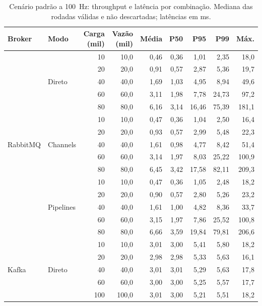 \begin{table}[p]
\centering
\caption{Cenário padrão a 100~Hz: throughput e latência por combinação. Mediana das
rodadas válidas e não descartadas; latências em ms.}
\label{tab:metricas-latencia}
\footnotesize
\begin{tabular}{|l|l|r|r|r|r|r|r|r|}
\hline
\textbf{Broker} & \textbf{Modo} & \textbf{Carga (mil)} & \textbf{Vazão (mil)} & \textbf{Média} & \textbf{P50} & \textbf{P95} & \textbf{P99} & \textbf{Máx.} \\
\hline
\multirow{15}{*}{RabbitMQ} & \multirow{5}{*}{Direto} & 10 & 10,0 & 0,46 & 0,36 & 1,01 & 2,35 & 18,0 \\
 &  & 20 & 20,0 & 0,91 & 0,57 & 2,87 & 5,36 & 19,7 \\
 &  & 40 & 40,0 & 1,69 & 1,03 & 4,95 & 8,94 & 49,6 \\
 &  & 60 & 60,0 & 3,11 & 1,98 & 7,78 & 24,73 & 97,2 \\
 &  & 80 & 80,0 & 6,16 & 3,14 & 16,46 & 75,39 & 181,1 \\
\cline{2-9}
 & \multirow{5}{*}{Channels} & 10 & 10,0 & 0,47 & 0,36 & 1,04 & 2,50 & 16,4 \\
 &  & 20 & 20,0 & 0,93 & 0,57 & 2,99 & 5,48 & 22,3 \\
 &  & 40 & 40,0 & 1,61 & 0,98 & 4,77 & 8,42 & 51,4 \\
 &  & 60 & 60,0 & 3,14 & 1,97 & 8,03 & 25,22 & 100,9 \\
 &  & 80 & 80,0 & 6,45 & 3,42 & 17,58 & 82,11 & 209,3 \\
\cline{2-9}
 & \multirow{5}{*}{Pipelines} & 10 & 10,0 & 0,47 & 0,36 & 1,05 & 2,48 & 18,2 \\
 &  & 20 & 20,0 & 0,90 & 0,57 & 2,80 & 5,26 & 23,2 \\
 &  & 40 & 40,0 & 1,61 & 1,00 & 4,82 & 8,36 & 33,7 \\
 &  & 60 & 60,0 & 3,15 & 1,97 & 7,86 & 25,52 & 100,8 \\
 &  & 80 & 80,0 & 6,66 & 3,59 & 19,84 & 79,81 & 206,6 \\
\hline
\multirow{24}{*}{Kafka} & \multirow{8}{*}{Direto} & 10 & 10,0 & 3,01 & 3,00 & 5,41 & 5,80 & 18,2 \\
 &  & 20 & 20,0 & 2,98 & 2,98 & 5,33 & 5,63 & 16,1 \\
 &  & 40 & 40,0 & 3,01 & 3,01 & 5,29 & 5,63 & 17,8 \\
 &  & 60 & 60,0 & 3,00 & 3,00 & 5,25 & 5,57 & 17,7 \\
 &  & 100 & 100,0 & 3,01 & 3,00 & 5,21 & 5,51 & 18,2 \\

\end{tabular}
\end{table}
